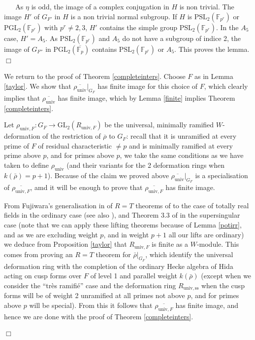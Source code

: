 \documentclass[12pt]{article}
\newcommand{\aFp}{\overline{\mathbb{F}_{p}}}
\newcommand{\GL}{\mathrm{GL}}
\newcommand{\rhobar}{\overline{\rho}}
\newenvironment{proof}{\smallskip\noindent{\bf Proof.}\
}{$\Box$\smallskip\goodbreak}
\def\rhobar{ {\bar {\rho} } }
\def\rhob{ {\bar {\rho} } }
\begin{document}
\begin{proof}
\begin{proof}
As $\eta$ is odd, the image of a complex conjugation in $H$ is non trivial.
The image $H'$ of $G_{F'}$ in
$H$ is a non trivial normal subgroup. 
If $H$ is $\mathrm{PSL}_2 (\mathbb{F}_{p^r})$ or
$\mathrm{PGL}_2 (\mathbb{F}_{p^r})$ with $p^r\not= 2,3$, $H'$ contains
the simple group $\mathrm{PSL}_2 (\mathbb{F}_{p^r})$.
In the $A_5$ case, $H'=A_5$. 
As $\mathrm{PSL}_2 (\mathbb{F}_{p^r})$ and $A_5$ do not have 
a subgroup of indice 2, the image of $G_{F''}$ in 
$\mathrm{PGL}_2 (\aFp )$ contains $\mathrm{PSL}_2 (\mathbb{F}_{p^r})$
or $A_5$. This proves
the lemma.\end{proof}

We return to the proof of Theorem \ref{completeinters}.
Choose $F$ as in Lemma \ref{taylor}.
We show that $\overline{\rho_{\mathrm{univ}}}|_{G_F}$
has finite image for this choice of $F$, which clearly implies that
$\overline{\rho_{\mathrm{univ}}}$
has finite image, which by Lemma \ref{finite}
implies Theorem \ref{completeinters}.

Let $\rho_{\mathrm{univ},F}:G_{F}\rightarrow \GL_2
(R_{\mathrm{univ},F})$ be the universal,
minimally ramified
$W$-deformation of the restriction of $\overline{\rho}$ to $G_F$:
recall that it is unramified at every prime of $F$ of residual
characteristic
$\not= p$ and is minimally ramified at every prime above $p$, and for
primes above $p$, we take the same conditions
as we have taken to define $\rho_{\mathrm{univ}}$ (and their variants
for the 2 deformation rings when $k(\rhobar)=p+1$).
Because of the claim we proved above
$\overline{\rho_{\mathrm{univ}}}|_{G_F}$
is a specialisation of $\overline{\rho_{\mathrm{univ},F}}$, amd it
will be enough to prove that
$\overline{\rho_{\mathrm{univ},F}}$ has finite image.

From Fujiwara's generalisation in \cite{Fujiwara}
of $R=T$ theorems of \cite{Wiles} to the case of totally real fields
 in the ordinary case (see also \cite{SW3}),
and Theorem 3.3 of
\cite{[T03]} in the supersingular case (note that we can apply these lifting
theorems because of Lemma \ref{potirr}, and as we are
excluding weight $p$, and in weight $p+1$ all our lifts are ordinary)
we deduce from Proposition \ref{taylor}
that $R_{\mathrm{univ},F}$ is finite as a $W$-module. 
This comes from
proving an $R=T$ theorem for $\rhob|_{G_{F}}$,
which identify the universal deformation ring with the
completion of the ordinary Hecke algebra of Hida acting on cusp forms over
$F$
of level
1 and parallel weight $k(\rhob)$ (except when we consider
the ``tr\`es ramifi\'e'' case and the  deformation  ring
$R_{\mathrm{univ,ss}}$ when the
cusp forms will be of weight 2 unramified at all primes not above $p$,
and
for primes above $p$ will be special). From this it follows that
$\overline{\rho_{\mathrm{univ},F}}$ has finite image, and hence we are
done
with the proof of Theorem \ref{completeinters}.

\end{proof}
\end{document}
